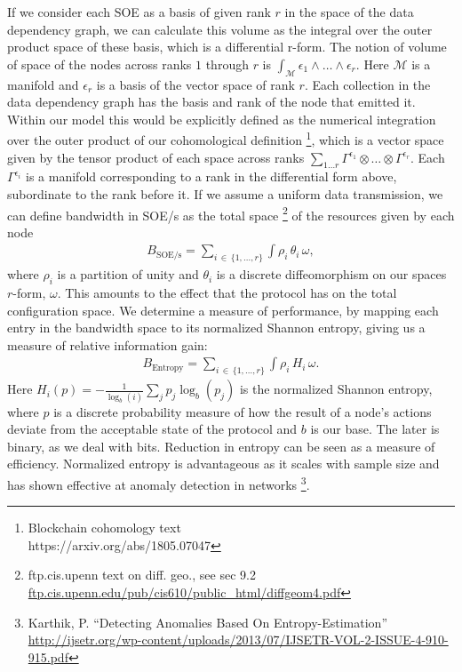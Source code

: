 \documentclass{article}
\begin{document}
If we consider each SOE as a basis of given rank $r$ in the space of the data dependency graph, we can calculate this volume as the integral over the outer product space of these basis, which is a differential r-form.
The notion of volume of space of the nodes across ranks $1$ through $r$ is
{$\int_\mathcal{M} \epsilon_1 \wedge \dots \wedge \epsilon_r.$}
Here $\mathcal{M}$ is a manifold and $\epsilon_r$ is a basis of the vector space of rank $r$. 
Each collection in the data dependency graph has the basis and rank of the node that emitted it. Within our model this would be explicitly defined as the numerical integration over the outer product of our cohomological definition
\footnote{Blockchain cohomology text\\ https://arxiv.org/abs/1805.07047},
which is a vector space given by the tensor product of each space across ranks 
{$\sum_{1 \dots r} \Gamma^{\epsilon_1} \otimes \dots \otimes \Gamma^{\epsilon_r}$}.
Each $\Gamma^{\epsilon_i}$ is a manifold corresponding to a rank in the differential form above, subordinate to the rank before it. If we assume a uniform data transmission, we can define bandwidth in SOE/s as the total space
\footnote{ftp.cis.upenn text on diff. geo., see sec 9.2\\ \url{ftp.cis.upenn.edu/pub/cis610/public_html/diffgeom4.pdf}} 
of the resources given by each node
\begin{equation*} \label{eq2}
\begin{split}
B_{\mathrm{SOE}/\mathrm{s}} = \sum_{i\,\in\,\{1, \dots, r\}} \int \rho_i\, \theta_i\, \omega,
\end{split}
\end{equation*}
where $\rho_i$ is a partition of unity and $\theta_i$ is a discrete diffeomorphism on our spaces $r$-form, $\omega$. This amounts to the effect that the protocol has on the total configuration space.
We determine a measure of performance, by mapping each entry in the bandwidth space to its normalized Shannon entropy, giving us a measure of relative information gain:
\begin{equation*} \label{eq3}
\begin{split}
B_\mathrm{Entropy} = \sum_{i\,\in\,\{1, \dots, r\}} \int \rho_i\, H_i\, \omega.
\end{split}
\end{equation*}
Here 
{$H_i(p) = - \tfrac{1}{\log_b(i)} \sum_j p_j \log_b(p_j)$}
is the normalized Shannon entropy, where $p$ is a discrete probability measure of how the result of a node's actions deviate from the acceptable state of the protocol and $b$ is our base. The later is binary, as we deal with bits. Reduction in entropy can be seen as a measure of efficiency. Normalized entropy is advantageous as it scales with sample size and has shown effective at anomaly detection in networks
\footnote{Karthik, P. ``Detecting Anomalies Based On Entropy-Estimation''\\ \url{http://ijsetr.org/wp-content/uploads/2013/07/IJSETR-VOL-2-ISSUE-4-910-915.pdf}}.
\end{document}
